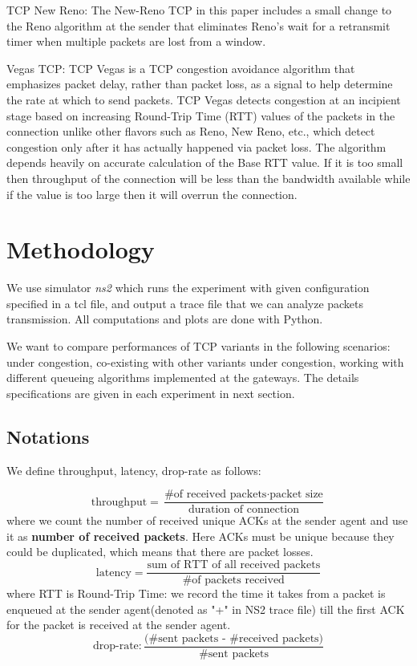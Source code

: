 \documentclass[10pt, conference]{IEEEtran/IEEEtran}
\begin{document}
TCP New Reno: The New-Reno TCP in this paper includes a small change to the Reno algorithm at the sender that eliminates Reno's wait for a retransmit timer when multiple packets are lost from a window. \cite{sim}

Vegas TCP: TCP Vegas is a TCP congestion avoidance algorithm that emphasizes packet delay, rather than packet loss, as a signal to help determine the rate at which to send packets. TCP Vegas detects congestion at an incipient stage based on increasing Round-Trip Time (RTT) values of the packets in the connection unlike other flavors such as Reno, New Reno, etc., which detect congestion only after it has actually happened via packet loss. The algorithm depends heavily on accurate calculation of the Base RTT value. If it is too small then throughput of the connection will be less than the bandwidth available while if the value is too large then it will overrun the connection.
%


\section{Methodology}

We use simulator \textit{ns2} which runs the experiment with given configuration specified in a tcl file, and
  output a trace file that we can analyze packets transmission. All computations and plots are done with Python.

We want to compare performances of TCP variants in the following scenarios: under congestion, co-existing with other variants under congestion, working with different queueing algorithms implemented at the gateways. The details specifications are given in each experiment in next section.
\subsection*{Notations}

We define throughput, latency, drop-rate as follows:

\[
\text{throughput}= \frac{\text{\# of received packets} \cdot \text{packet size}}{\text{duration of connection}}
\]
where we count the number of received unique ACKs at the sender agent and use it as \textbf{number of received packets}. Here ACKs must be unique because they could be duplicated, which means that there are packet losses.
\[
\text{latency}=\frac{\text{sum of RTT of all received packets} }{\text{\# of packets received}}
\]
where RTT is Round-Trip Time: we record the time it takes from a packet is enqueued at the sender agent(denoted as "+" in NS2 trace file) till the first ACK for the packet is received at the sender agent.
\[
\text{drop-rate}: \frac{\text{(\# sent packets - \# received packets)}}{\text{\# sent packets}}
\]
\end{document}
